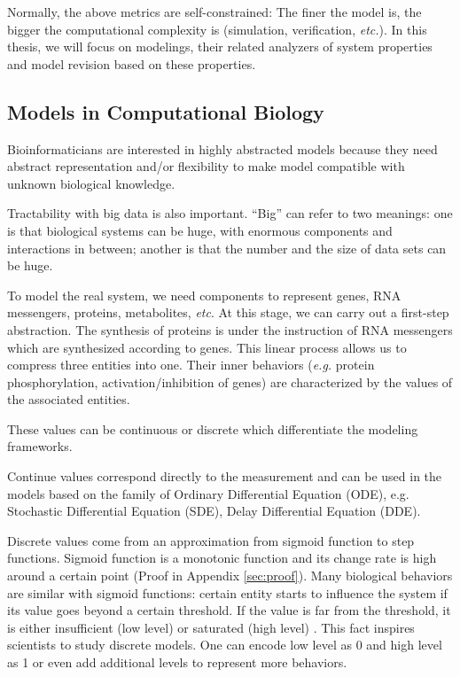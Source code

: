 Normally, the above metrics are self-constrained:
The finer the model is, the bigger the computational complexity is (simulation, verification, \textit{etc.}).
In this thesis, we will focus on modelings, their related analyzers of system properties and model revision based on these properties.

\subsection{Models in Computational Biology}
Bioinformaticians are interested in highly abstracted models because they need abstract representation and/or flexibility to make model compatible with unknown biological knowledge.

Tractability with big data is also important.
``Big'' can refer to two meanings: one is that biological systems can be huge, with enormous components and interactions in between; another is that the number and the size of data sets can be huge.

To model the real system, we need components to represent genes, RNA messengers, proteins, metabolites, \textit{etc}.
At this stage, we can carry out a first-step abstraction.
The synthesis of proteins is under the instruction of RNA messengers which are synthesized according to genes.
This linear process allows us to compress three entities into one.
Their inner behaviors (\textit{e.g.} protein phosphorylation, activation/inhibition of genes) are characterized by the values of the associated entities.

These values can be continuous or discrete which differentiate the modeling frameworks.

Continue values correspond directly to the measurement and can be used in the models based on the family of Ordinary Differential Equation (ODE), e.g. Stochastic Differential Equation (SDE), Delay Differential Equation (DDE).

Discrete values come from an approximation from sigmoid function to step functions. 
Sigmoid function is a monotonic function and its change rate is high around a certain point (Proof in Appendix \ref{sec:proof}).
Many biological behaviors are similar with sigmoid functions: certain entity starts to influence the system if its value goes beyond a certain threshold.
If the value is far from the threshold, it is either insufficient (low level) or saturated (high level) \cite{kauffman1969,von2000segment}.
This fact inspires scientists to study discrete models.
One can encode low level as 0 and high level as 1 or even add additional levels to represent more behaviors.

